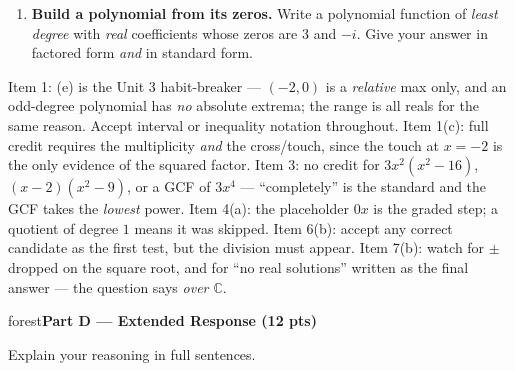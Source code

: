 \documentclass[10pt]{article}
\newcommand{\parthead}[1]{%
  \vspace{6pt}\noindent
  \begin{headlinebox}{forest}\color{white}\bfseries #1\end{headlinebox}%
  \vspace{4pt}}
\begin{document}
\begin{enumerate}[leftmargin=1.9em, itemsep=10pt]
  \item \textbf{Build a polynomial from its zeros.} Write a polynomial function of \emph{least degree}
        with \emph{real} coefficients whose zeros are $3$ and $-i$. Give your answer in factored form
        \emph{and} in standard form.
        \vadjust{\nobreak}\vspace{16pt}
\end{enumerate}

\begin{teachernote}
Item 1: (e) is the Unit 3 habit-breaker --- $(-2,0)$ is a \emph{relative} max only, and an odd-degree
polynomial has \emph{no} absolute extrema; the range is all reals for the same reason. Accept
interval or inequality notation throughout. Item 1(c): full credit requires the multiplicity
\emph{and} the cross/touch, since the touch at $x=-2$ is the only evidence of the squared factor.
Item 3: no credit for $3x^2(x^2-16)$, $(x-2)(x^2-9)$, or a GCF of $3x^4$ --- ``completely'' is the
standard and the GCF takes the \emph{lowest} power. Item 4(a): the placeholder $0x$ is the graded
step; a quotient of degree $1$ means it was skipped. Item 6(b): accept any correct candidate as the
first test, but the division must appear. Item 7(b): watch for $\pm$ dropped on the square root, and
for ``no real solutions'' written as the final answer --- the question says \emph{over $\mathbb{C}$}.
\end{teachernote}

\boxguard[36]%
\parthead{Part D --- Extended Response (12 pts)}
Explain your reasoning in full sentences.
\end{document}
